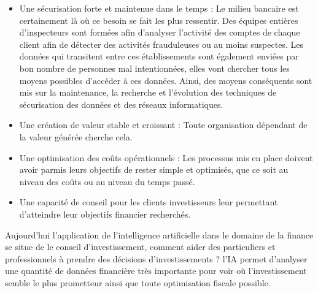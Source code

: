 \begin{itemize}

    \item Une sécurisation forte et maintenue dans le temps : \newline
    Le milieu bancaire est certainement là où ce besoin se fait les plus ressentir.
    Des équipes entières d'inspecteurs sont formées afin d'analyser
    l'activité des comptes de chaque client
    afin de détecter des activités frauduleuses ou au moins suspectes. \newline
    Les données qui transitent entre ces établissements sont également
    enviées par bon nombre de personnes mal intentionnées,
    elles vont chercher tous les moyens possibles d'accéder à ces données. Ainsi,
    des moyens conséquents sont mis sur la maintenance, la recherche et l'évolution
    des techniques de sécurisation des données et des réseaux informatiques. \newline

    \item Une création de valeur stable et croissant : \newline
    Toute organisation dépendant de la valeur générée cherche cela. \newline

    \item Une optimisation des coûts opérationnels : \newline
    Les processus mis en place doivent avoir parmis leurs objectifs de
    rester simple et optimisés, que ce soit au niveau des coûts
    ou au niveau du temps passé. \newline

    \item Une capacité de conseil pour les clients investisseurs leur permettant 
    d'atteindre leur objectifs financier recherchés. \newline
\end{itemize}

Aujourd'hui l'application de l'intelligence artificielle dans le domaine de la finance 
se situe de le conseil d'investissement, comment aider des particuliers et professionnels 
à prendre des décisions d'investissements ? l'IA permet d'analyser une quantité 
de données financière très importante pour voir où l'investissement semble le plus prometteur 
ainsi que toute optimisation fiscale possible. \newline 

